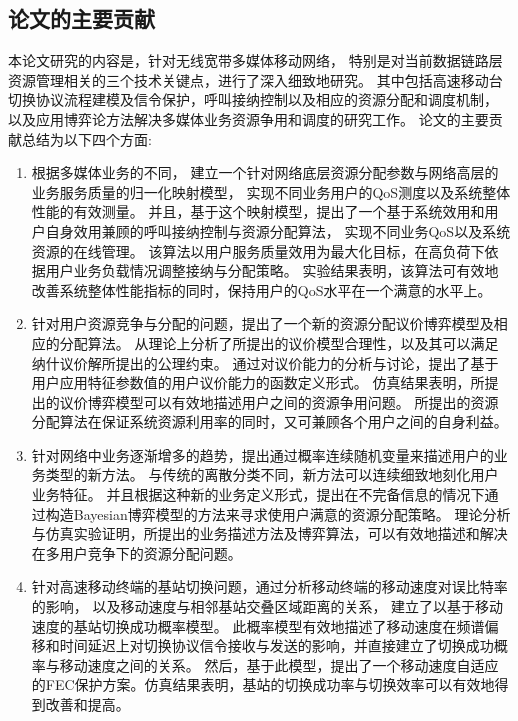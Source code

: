 \subsection{论文的主要贡献}
本论文研究的内容是，针对无线宽带多媒体移动网络，
特别是对当前数据链路层资源管理相关的三个技术关键点，进行了深入细致地研究。
其中包括高速移动台切换协议流程建模及信令保护，呼叫接纳控制以及相应的资源分配和调度机制，
以及应用博弈论方法解决多媒体业务资源争用和调度的研究工作。
论文的主要贡献总结为以下四个方面:
\begin{enumerate}[(1.)]

\item 
根据多媒体业务的不同，
建立一个针对网络底层资源分配参数与网络高层的业务服务质量的归一化映射模型，
实现不同业务用户的QoS测度以及系统整体性能的有效测量。
并且，基于这个映射模型，提出了一个基于系统效用和用户自身效用兼顾的呼叫接纳控制与资源分配算法，
实现不同业务QoS以及系统资源的在线管理。
该算法以用户服务质量效用为最大化目标，在高负荷下依据用户业务负载情况调整接纳与分配策略。
实验结果表明，该算法可有效地改善系统整体性能指标的同时，保持用户的QoS水平在一个满意的水平上。

\item 
针对用户资源竞争与分配的问题，提出了一个新的资源分配议价博弈模型及相应的分配算法。
从理论上分析了所提出的议价模型合理性，以及其可以满足纳什议价解所提出的公理约束。
通过对议价能力的分析与讨论，提出了基于用户应用特征参数值的用户议价能力的函数定义形式。
仿真结果表明，所提出的议价博弈模型可以有效地描述用户之间的资源争用问题。
所提出的资源分配算法在保证系统资源利用率的同时，又可兼顾各个用户之间的自身利益。

\item 
针对网络中业务逐渐增多的趋势，提出通过概率连续随机变量来描述用户的业务类型的新方法。
与传统的离散分类不同，新方法可以连续细致地刻化用户业务特征。
并且根据这种新的业务定义形式，提出在不完备信息的情况下通过构造Bayesian博弈模型的方法来寻求使用户满意的资源分配策略。
理论分析与仿真实验证明，所提出的业务描述方法及博弈算法，可以有效地描述和解决在多用户竞争下的资源分配问题。

\item 
针对高速移动终端的基站切换问题，通过分析移动终端的移动速度对误比特率的影响，
以及移动速度与相邻基站交叠区域距离的关系，
建立了以基于移动速度的基站切换成功概率模型。
此概率模型有效地描述了移动速度在频谱偏移和时间延迟上对切换协议信令接收与发送的影响，并直接建立了切换成功概率与移动速度之间的关系。
然后，基于此模型，提出了一个移动速度自适应的FEC保护方案。仿真结果表明，基站的切换成功率与切换效率可以有效地得到改善和提高。
\end{enumerate}

